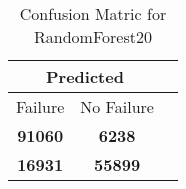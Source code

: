 \begin{table}[] 
\caption{Confusion Matric for RandomForest20} 
\label{Table: Prediction Accuracy-DMDRandomForest20OnlySunEKF-ignoreReflection-Reflection} 
\centering 
\begin{tabular} 
 {@{}ccc@{}} 
\toprule 
\multicolumn{2}{c}{\textbf{Predicted}}
 \\ \midrule 
\multicolumn{1}{|c|}{Failure} & 
\multicolumn{1}{c|}{No Failure}
 \\ \midrule 
\multicolumn{1}{|c|}{\color{green}\textbf{91060}} & 
\multicolumn{1}{c|}{\color{red}\textbf{6238}}
 \\ \midrule 
\multicolumn{1}{|c|}{\color{red}\textbf{16931}} & 
\multicolumn{1}{c|}{\color{green}\textbf{55899}}
 \\ \bottomrule 
\end{tabular} 
\end{table} 
